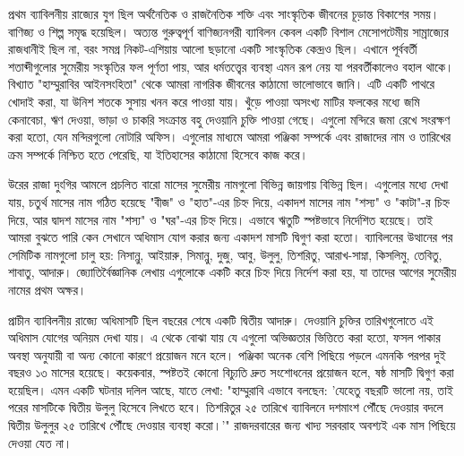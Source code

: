 প্রথম ব্যাবিলনীয় রাজ্যের যুগ ছিল অর্থনৈতিক ও রাজনৈতিক শক্তি এবং সাংস্কৃতিক জীবনের চূড়ান্ত বিকাশের সময়। বাণিজ্য ও শিল্প সমৃদ্ধ হয়েছিল। অত্যন্ত গুরুত্বপূর্ণ বাণিজ্যনগরী ব্যাবিলন কেবল একটি বিশাল মেসোপটেমীয় সাম্রাজ্যের রাজধানীই ছিল না, বরং সমগ্র নিকট-এশিয়ায় আলো ছড়ানো একটি সাংস্কৃতিক কেন্দ্রও ছিল। এখানে পূর্ববর্তী শতাব্দীগুলোর সুমেরীয় সংস্কৃতির ফল পূর্ণতা পায়, আর ধর্মতত্ত্বের ব্যবস্থা এমন রূপ নেয় যা পরবর্তীকালেও বহাল থাকে। বিখ্যাত "হাম্মুরাবির আইনসংহিতা" থেকে আমরা নাগরিক জীবনের কাঠামো ভালোভাবে জানি। এটি একটি পাথরে খোদাই করা, যা উনিশ শতকে সুসায় খনন করে পাওয়া যায়। খুঁড়ে পাওয়া অসংখ্য মাটির ফলকের মধ্যে জমি কেনাবেচা, ঋণ দেওয়া, ভাড়া ও চাকরি সংক্রান্ত বহু দেওয়ানি চুক্তি পাওয়া গেছে। এগুলো মন্দিরে জমা রেখে সংরক্ষণ করা হতো, যেন মন্দিরগুলো নোটারি অফিস। এগুলোর মাধ্যমে আমরা পঞ্জিকা সম্পর্কে এবং রাজাদের নাম ও তারিখের ক্রম সম্পর্কে নিশ্চিত হতে পেরেছি, যা ইতিহাসের কাঠামো হিসেবে কাজ করে।

উরের রাজা দুংগির আমলে প্রচলিত বারো মাসের সুমেরীয় নামগুলো বিভিন্ন জায়গায় বিভিন্ন ছিল। এগুলোর মধ্যে দেখা যায়, চতুর্থ মাসের নাম গঠিত হয়েছে "বীজ" ও "হাত"-এর চিহ্ন দিয়ে, একাদশ মাসের নাম "শস্য" ও "কাটা"-র চিহ্ন দিয়ে, আর দ্বাদশ মাসের নাম "শস্য" ও "ঘর"-এর চিহ্ন দিয়ে। এভাবে ঋতুটি স্পষ্টভাবে নির্দেশিত হয়েছে। তাই আমরা বুঝতে পারি কেন সেখানে অধিমাস যোগ করার জন্য একাদশ মাসটি দ্বিগুণ করা হতো। ব্যাবিলনের উত্থানের পর সেমিটিক নামগুলো চালু হয়: নিসান্নু, আইয়ারু, সিমান্নু, দুজু, আবু, উলুলু, তিশরিতু, আরাখ-সাম্না, কিসলিমু, তেবিতু, শাবাতু, আদারু। জ্যোতির্বৈজ্ঞানিক লেখায় এগুলোকে একটি করে চিহ্ন দিয়ে নির্দেশ করা হয়, যা তাদের আগের সুমেরীয় নামের প্রথম অক্ষর।

প্রাচীন ব্যাবিলনীয় রাজ্যে অধিমাসটি ছিল বছরের শেষে একটি দ্বিতীয় আদারু। দেওয়ানি চুক্তির তারিখগুলোতে এই অধিমাস যোগের অনিয়ম দেখা যায়। এ থেকে বোঝা যায় যে এগুলো অভিজ্ঞতার ভিত্তিতে করা হতো, ফসল পাকার অবস্থা অনুযায়ী বা অন্য কোনো কারণে প্রয়োজন মনে হলে। পঞ্জিকা অনেক বেশি পিছিয়ে পড়লে এমনকি পরপর দুই বছরও ১৩ মাসের হয়েছে। কয়েকবার, স্পষ্টতই কোনো বিচ্যুতি দ্রুত সংশোধনের প্রয়োজন হলে, ষষ্ঠ মাসটি দ্বিগুণ করা হয়েছিল। এমন একটি ঘটনার দলিল আছে, যাতে লেখা: "হাম্মুরাবি এভাবে বলছেন: 'যেহেতু বছরটি ভালো নয়, তাই পরের মাসটিকে দ্বিতীয় উলুলু হিসেবে লিখতে হবে। তিশরিতুর ২৫ তারিখে ব্যাবিলনে দশমাংশ পৌঁছে দেওয়ার বদলে দ্বিতীয় উলুলুর ২৫ তারিখে পৌঁছে দেওয়ার ব্যবস্থা করো।'" রাজদরবারের জন্য খাদ্য সরবরাহ অবশ্যই এক মাস পিছিয়ে দেওয়া যেত না।

